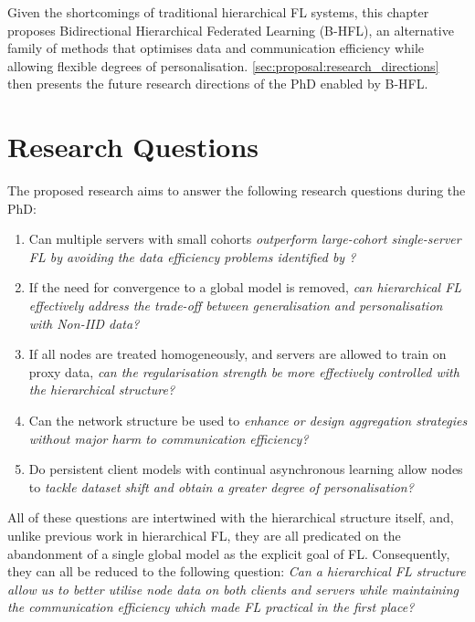 Given the shortcomings of traditional hierarchical FL systems, this chapter proposes Bidirectional Hierarchical Federated Learning (B-HFL), an alternative family of methods that optimises data and communication efficiency while allowing flexible degrees of personalisation. \cref{sec:proposal:research_directions} then presents the future research directions of the PhD enabled by B-HFL\@.

\section{Research Questions}\label{sec:proposal:research_questions}
The proposed research aims to answer the following research questions during the PhD\@:
\begin{singlespace*}
    \begin{enumerate}
        \item Can multiple servers with small cohorts \emph{outperform large-cohort single-server FL by avoiding the data efficiency problems identified by \citet{LargeCohorts}?}
        \item If the need for convergence to a global model is removed, \emph{can hierarchical FL effectively address the trade-off between generalisation and personalisation with Non-IID data?}
        \item If all nodes are treated homogeneously, and servers are allowed to train on proxy data, \emph{can the regularisation strength be more effectively controlled with the hierarchical structure?}
        \item Can the network structure be used to \emph{enhance or design aggregation strategies without major harm to communication efficiency?}
        \item Do persistent client models with continual asynchronous learning allow nodes to \emph{tackle dataset shift and obtain a greater degree of personalisation?}
    \end{enumerate}
\end{singlespace*}
All of these questions are intertwined with the hierarchical structure itself, and, unlike previous work in hierarchical FL, they are all predicated on the abandonment of a single global model as the explicit goal of FL\@. Consequently, they can all be reduced to the following question: \emph{Can a hierarchical FL structure allow us to better utilise node data on both clients and servers while maintaining the communication efficiency which made FL practical in the first place?}

